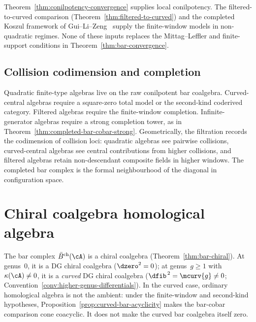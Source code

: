 \begin{remark}
Theorem~\ref{thm:conilpotency-convergence} supplies local
conilpotency. The filtered-to-curved comparison
(Theorem~\ref{thm:filtered-to-curved}) and the completed Koszul
framework of Gui--Li--Zeng~\cite{GLZ22} supply the finite-window
models in non-quadratic regimes. None of these inputs replaces the
Mittag--Leffler and finite-support conditions in
Theorem~\ref{thm:bar-convergence}.
\end{remark}

\subsection{Collision codimension and completion}

\begin{remark}\label{rem:finite-window-before-verdier}
Quadratic finite-type algebras live on the raw conilpotent bar
coalgebra. Curved-central algebras require a square-zero total model or
the second-kind coderived category. Filtered algebras require the
finite-window completion. Infinite-generator algebras require a strong
completion tower, as in Theorem~\ref{thm:completed-bar-cobar-strong}.
Geometrically, the filtration records the codimension of collision
loci: quadratic algebras see pairwise collisions, curved-central
algebras see central contributions from higher collisions, and filtered
algebras retain non-descendant composite fields in higher windows. The
completed bar complex is the formal neighbourhood of the diagonal in
configuration space.
\end{remark}

\section{Chiral coalgebra homological algebra}
\label{sec:chiral-coalgebra-homalg}

The bar complex $\bar{B}^{\mathrm{ch}}(\cA)$ is a chiral coalgebra
(Theorem~\ref{thm:bar-chiral}). At genus~$0$, it is a
DG chiral coalgebra ($\dzero^2 = 0$); at genus~$g \geq 1$ with
$\kappa(\cA) \neq 0$, it is a \emph{curved} DG chiral coalgebra
($\dfib^{\,2} = \mcurv{g} \neq 0$;
Convention~\ref{conv:higher-genus-differentials}). In the curved case,
ordinary homological algebra is not the ambient: under the finite-window
and second-kind hypotheses,
Proposition~\ref{prop:curved-bar-acyclicity} makes the bar-cobar
comparison cone coacyclic. It does not make the curved bar coalgebra
itself zero.

